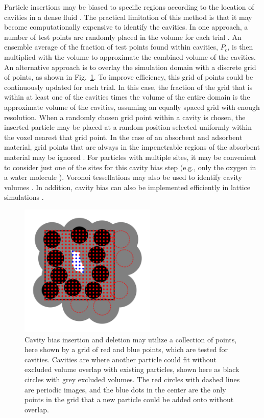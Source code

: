 \documentclass[
  9pt,
  bestpractices,
]{livecoms}
\begin{document}
Particle insertions may be biased to specific regions according to the location of cavities in a dense fluid \cite{mezei_cavity-biased_1980, mezei_grand-canonical_1987, snurr_prediction_1993, ikeda_generalization_2024}.
The practical limitation of this method is that it may become computationally expensive to identify the cavities.
In one approach, a number of test points are randomly placed in the volume for each trial \cite{mezei_cavity-biased_1980, mezei_grand-canonical_1987, snurr_prediction_1993}.
An ensemble average of the fraction of test points found within cavities, $P_c$, is then multiplied with the volume to approximate the combined volume of the cavities.
An alternative approach is to overlay the simulation domain with a discrete grid of points, as shown in Fig.~\ref{fig:cavity}.
To improve efficiency, this grid of points could be continuously updated for each trial.
In this case, the fraction of the grid that is within at least one of the cavities times the volume of the entire domain is the approximate volume of the cavities, assuming an equally spaced grid with enough resolution.
When a randomly chosen grid point within a cavity is chosen, the inserted particle may be placed at a random position selected uniformly within the voxel nearest that grid point.
In the case of an absorbent and adsorbent material, grid points that are always in the impenetrable regions of the absorbent material may be ignored \cite{snurr_prediction_1993}.
For particles with multiple sites, it may be convenient to consider just one of the sites for this cavity bias step (e.g., only the oxygen in a water molecule \cite{zhang_computational_2017}).
Voronoi tessellations may also be used to identify cavity volumes \cite{sastry_statistical_1997}.
In addition, cavity bias can also be implemented efficiently in lattice simulations \cite{barnes_structure_2009}.

\begin{figure}
\begin{centering}
\includegraphics[width=6.5cm]{../figures/cavity.png}
\caption{
Cavity bias insertion and deletion may utilize a collection of points, here shown by a grid of red and blue points, which are tested for cavities.
Cavities are where another particle could fit without excluded volume overlap with existing particles, shown here as black circles with grey excluded volumes.
The red circles with dashed lines are periodic images, and the blue dots in the center are the only points in the grid that a new particle could be added onto without overlap.
}
\label{fig:cavity}
\end{centering}
\end{figure}
\end{document}
